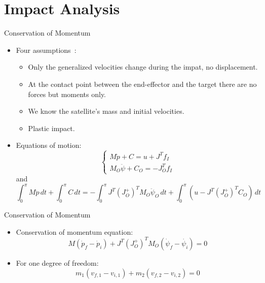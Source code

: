 \section{Impact Analysis}

\begin{frame}{Conservation of Momentum}
    \begin{itemize}
        \item Four assumptions~\cite{1997}: \begin{itemize}
            \item Only the generalized velocities change during the impat, no displacement.
            \item At the contact point between the end-effector and the target there are no forces but moments only.
            \item We know the satellite's mass and initial velocities.
            \item Plastic impact.
        \end{itemize}
        \item Equations of motion: \begin{equation}
                \begin{cases}
                  M\ddot{p}+C=u+J^Tf_I\\
                  M_O\ddot{\psi}+C_O=-J_O^Tf_I
                \end{cases}
              \end{equation}
              and \begin{equation}
                \int_{0}^{\pi}M\ddot{p}\,dt+\int_{0}^{\pi}C\,dt =-\int_{0}^{\pi}J^T(J_O^+)^TM_O\ddot{\psi}_O\,dt+\int_{0}^{\pi}(u-J^T(J_O^+)^TC_O)\,dt
              \end{equation}
    \end{itemize}
\end{frame}

\begin{frame}{Conservation of Momentum}
\begin{itemize}
    \item Conservation of momentum equation:
    \begin{equation}
        M(\dot{p}_f-\dot{p}_i)+J^T(J_O^+)^TM_O(\dot{\psi}_f-\dot{\psi_i})=0
        \label{conservation}
      \end{equation}
    \item For one degree of freedom:
    \begin{equation}
        m_1(v_{f,1}-v_{i,1})+m_2(v_{f,2}-v_{i,2})=0
      \end{equation}
\end{itemize}    
\end{frame}

